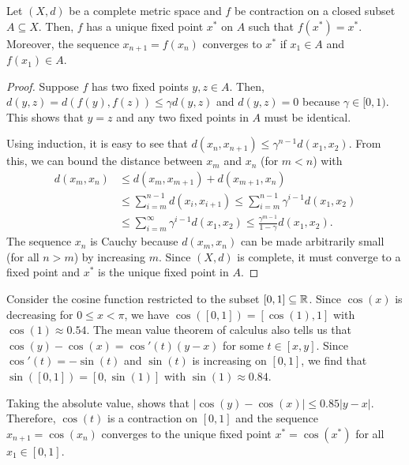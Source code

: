 \begin{theorem}
Let $(X,d)$ be a complete metric space and $f$ be contraction on a closed subset $A \subseteq X$.
Then, $f$ has a unique fixed point $x^*$ on $A$ such that $f(x^*) = x^*$.
Moreover, the sequence $x_{n+1} = f(x_n)$ converges to $x^*$ if $x_1 \in A$ and $f(x_1) \in A$.
\end{theorem}
\begin{proof}
Suppose $f$ has two fixed points $y,z\in A$.
Then, $d(y,z) = d \left(f(y),f(z) \right) \leq \gamma  d(y,z)$ and $d(y,z) = 0$ because $\gamma \in [0,1)$.
This shows that $y=z$ and any two fixed points in $A$ must be identical.

Using induction, it is easy to see that $d(x_n,x_{n+1}) \leq \gamma^{n-1} d(x_1,x_2)$.
From this, we can bound the distance between $x_m$ and $x_n$ (for $m<n$) with
\begin{align*}
d(x_m,x_n)
& \leq d(x_m,x_{m+1}) + d(x_{m+1},x_n) \\
& \leq \sum_{i=m}^{n-1} d(x_i,x_{i+1}) 
 \leq \sum_{i=m}^{n-1} \gamma^{i-1} d(x_1,x_2) \\
& \leq \sum_{i=m}^\infty \gamma^{i-1} d(x_1,x_2) 
 \leq \frac{\gamma^{m-1}}{1-\gamma} d(x_1,x_2).
\end{align*}
The sequence $x_n$ is Cauchy because $d(x_m,x_n)$ can be made arbitrarily small (for all $n>m$) by increasing $m$.
Since $(X,d)$ is complete, it must converge to a fixed point and $x^*$ is the unique fixed point in $A$.
\end{proof}

\begin{example}
Consider the cosine function restricted to the subset $[0,1]\subseteq \mathbb{R}$.
Since $\cos(x)$ is decreasing for $0 \leq x < \pi$, we have $\cos([0,1]) = [\cos(1),1]$ with $\cos(1) \approx 0.54$.
The mean value theorem of calculus also tells us that $\cos(y) - \cos(x) = \cos '(t) (y-x)$ for some $t\in [x,y]$.
Since $\cos '(t) = -\sin(t)$ and $\sin(t)$ is increasing on $[0,1]$, we find that $\sin([0,1]) = [0,\sin(1)]$ with $\sin(1) \approx 0.84$.

Taking the absolute value, shows that $| \cos(y) - \cos(x) | \leq 0.85 |y-x|$.
Therefore, $\cos(t)$ is a contraction on $[0,1]$ and the sequence $x_{n+1} = \cos(x_n)$ converges to the unique fixed point $x^* = \cos(x^*)$ for all $x_1 \in [0,1]$.
\end{example}



